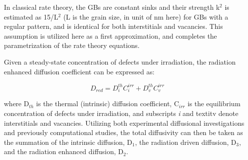 \documentclass[review]{elsarticle}
\begin{document}
In classical rate theory, the GBs are constant sinks and their strength k$^2$ is estimated as 15/L$^2$ (L is the grain size, in unit of nm here) for GBs with a regular pattern, and is identical for both interstitials and vacancies. This assumption is utilized here as a first approximation, and completes the parametrization of the rate theory equations.

Given a steady-state concentration of defects under irradiation, the radiation enhanced diffusion coefficient can be expressed as:

\begin{equation}
\label{eq:4}
D_{red} = D^{th}_iC^{irr}_i + D^{th}_vC^{irr}_v
\end{equation}

where D$_{th}$ is the thermal (intrinsic) diffusion coefficient, C$_{irr}$ is the equilibrium concentration of defects under irradiation, and subscripts \textit{i} and textit{v} denote interstitials and vacancies. Utilizing both experimental diffusional investigations and previously computational studies, the total diffusivity can then be taken as the summation of the intrinsic diffusion, D$_1$, the radiation driven diffusion, D$_3$, and the radiation enhanced diffusion, D$_2$.
\end{document}
